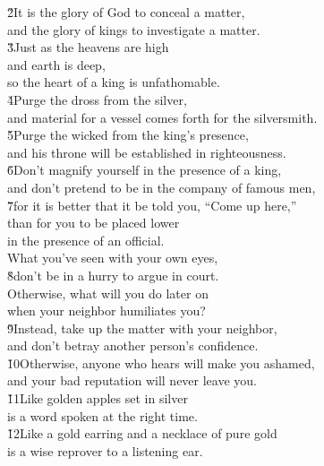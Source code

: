 \begin{poetry}
\poeml \v{2}It is the glory of God to conceal a matter, \\
\poemll    and the glory of kings to investigate a matter. \\
\poeml \v{3}Just as the heavens are high \\
\poemll    and earth is deep, \\
\poemlll       so the heart of a king is unfathomable. \\
\poeml \v{4}Purge the dross from the silver, \\
\poemll    and material for a vessel comes forth for the silversmith. \\
\poeml \v{5}Purge the wicked from the king's presence, \\
\poemll    and his throne will be established in righteousness. \\
\poeml \v{6}Don't magnify yourself in the presence of a king, \\
\poemll    and don't pretend to be in the company of famous men, \\
\poeml \v{7}for it is better that it be told you, ``Come up here,'' \\
\poemll    than for you to be placed lower \\
\poemlll       in the presence of an official. \\
\poeml What you've seen with your own eyes, \\
\poeml \v{8}don't be in a hurry to argue in court. \\
\poeml Otherwise, what will you do later on \\
\poemll    when your neighbor humiliates you? \\
\poeml \v{9}Instead, take up the matter with your neighbor, \\
\poemll    and don't betray another person's confidence. \\
\poeml \v{10}Otherwise, anyone who hears will make you ashamed, \\
\poemll    and your bad reputation will never leave you. \\
\poeml \v{11}Like golden apples set in silver \\
\poemll    is a word spoken at the right time. \\
\poeml \v{12}Like a gold earring and a necklace of pure gold \\
\poemll    is a wise reprover to a listening ear. \\

\end{poetry}

